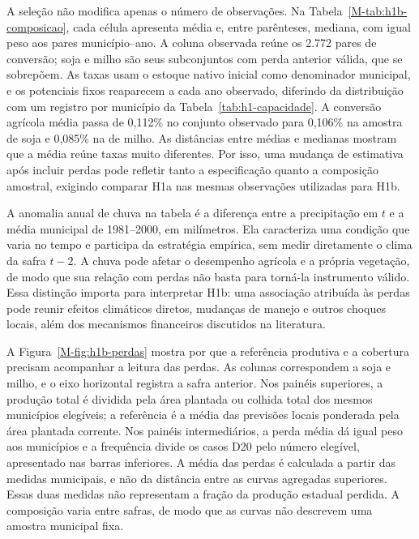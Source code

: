 A seleção não modifica apenas o número de observações. Na Tabela~\ref{M-tab:h1b-composicao}, cada célula apresenta média e, entre parênteses, mediana, com igual peso aos pares município--ano. A coluna observada reúne os 2.772 pares de conversão; soja e milho são seus subconjuntos com perda anterior válida, que se sobrepõem. As taxas usam o estoque nativo inicial como denominador municipal, e os potenciais fixos reaparecem a cada ano observado, diferindo da distribuição com um registro por município da Tabela~\ref{tab:h1-capacidade}. A conversão agrícola média passa de 0,112\% no conjunto observado para 0,106\% na amostra de soja e 0,085\% na de milho. As distâncias entre médias e medianas mostram que a média reúne taxas muito diferentes. Por isso, uma mudança de estimativa após incluir perdas pode refletir tanto a especificação quanto a composição amostral, exigindo comparar H1a nas mesmas observações utilizadas para H1b.



A anomalia anual de chuva na tabela é a diferença entre a precipitação em $t$ e a média municipal de 1981--2000, em milímetros. Ela caracteriza uma condição que varia no tempo e participa da estratégia empírica, sem medir diretamente o clima da safra $t-2$. A chuva pode afetar o desempenho agrícola e a própria vegetação, de modo que sua relação com perdas não basta para torná-la instrumento válido. Essa distinção importa para interpretar H1b: uma associação atribuída às perdas pode reunir efeitos climáticos diretos, mudanças de manejo e outros choques locais, além dos mecanismos financeiros discutidos na literatura.

A Figura~\ref{M-fig:h1b-perdas} mostra por que a referência produtiva e a cobertura precisam acompanhar a leitura das perdas. As colunas correspondem a soja e milho, e o eixo horizontal registra a safra anterior. Nos painéis superiores, a produção total é dividida pela área plantada ou colhida total dos mesmos municípios elegíveis; a referência é a média das previsões locais ponderada pela área plantada corrente. Nos painéis intermediários, a perda média dá igual peso aos municípios e a frequência divide os casos D20 pelo número elegível, apresentado nas barras inferiores. A média das perdas é calculada a partir das medidas municipais, e não da distância entre as curvas agregadas superiores. Essas duas medidas não representam a fração da produção estadual perdida. A composição varia entre safras, de modo que as curvas não descrevem uma amostra municipal fixa.



